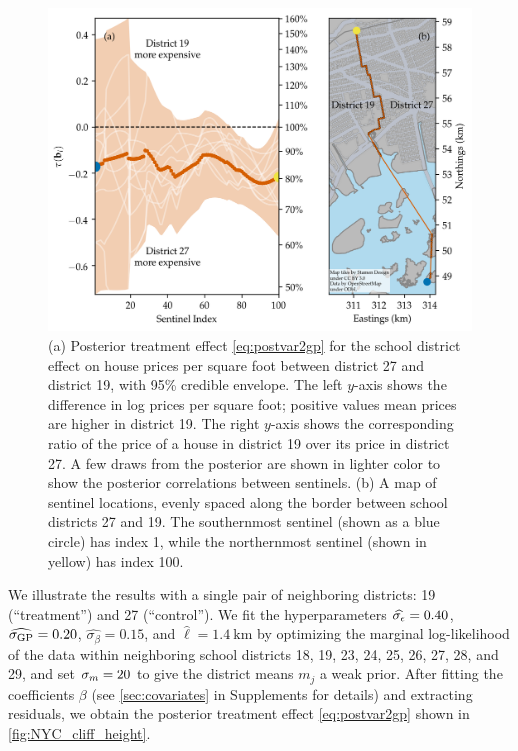 \documentclass{article}
\newcommand{\autorefexternal}[1]{\autoref*{#1}}
\begin{document}
\begin{figure}
  \begin{minipage}[c]{0.5\textwidth}
    \includegraphics[width=\textwidth]{figures/NYC_cliff_face.png}
  \end{minipage}\hfill
  \begin{minipage}[c]{0.5\textwidth}
    \caption{
        (a)
        Posterior treatment effect \autoref{eq:postvar2gp} for the school district effect on house prices per square foot between district 27 and district 19, with 95\% credible envelope.
        The left \(y\)-axis shows the difference in log prices per square foot; positive values mean prices are higher in district 19.
        The right \(y\)-axis shows the corresponding ratio of the price of a house in district 19 over its price in district 27.
        A few draws from the posterior are shown in lighter color to show the posterior correlations between sentinels.
        (b)
        A map of sentinel locations, evenly spaced along the border between school districts 27 and 19.
    	The southernmost sentinel (shown as a blue circle) has index 1, while the northernmost sentinel (shown in yellow) has index 100.\label{fig:NYC_cliff_height}
    } 
  \end{minipage}
\end{figure}

We illustrate the results with a single pair of neighboring districts: 19 (``treatment'') and 27 (``control'').
We fit the hyperparameters \(\widehat{\sigma_{\epsilon}}=0.40\), \(\widehat{\sigma_{\mathrm{GP}}}=0.20\), \(\widehat{\sigma_\beta}=0.15\), and \(\widehat{\ell}=1.4~\text{km}\)
by optimizing the marginal log-likelihood of the data within neighboring school districts 18, 19, 23, 24, 25, 26, 27, 28, and 29,
and set \(\sigma_{m}=20\) to give the district means \(m_j\) a weak prior.
After fitting the coefficients $\beta$ (see \autorefexternal{sec:covariates} in Supplements for details) and extracting residuals, we obtain the posterior treatment effect \autoref{eq:postvar2gp} shown in \autoref{fig:NYC_cliff_height}.
\end{document}
